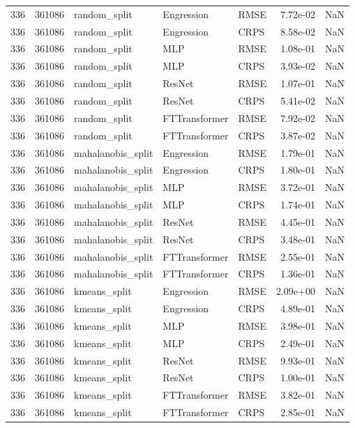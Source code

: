 \begin{tabular}{rrlllrr}
336 & 361086 & random\_split & Engression & RMSE & 7.72e-02 & NaN \\
336 & 361086 & random\_split & Engression & CRPS & 8.58e-02 & NaN \\
336 & 361086 & random\_split & MLP & RMSE & 1.08e-01 & NaN \\
336 & 361086 & random\_split & MLP & CRPS & 3.93e-02 & NaN \\
336 & 361086 & random\_split & ResNet & RMSE & 1.07e-01 & NaN \\
336 & 361086 & random\_split & ResNet & CRPS & 5.41e-02 & NaN \\
336 & 361086 & random\_split & FTTransformer & RMSE & 7.92e-02 & NaN \\
336 & 361086 & random\_split & FTTransformer & CRPS & 3.87e-02 & NaN \\
336 & 361086 & mahalanobis\_split & Engression & RMSE & 1.79e-01 & NaN \\
336 & 361086 & mahalanobis\_split & Engression & CRPS & 1.80e-01 & NaN \\
336 & 361086 & mahalanobis\_split & MLP & RMSE & 3.72e-01 & NaN \\
336 & 361086 & mahalanobis\_split & MLP & CRPS & 1.74e-01 & NaN \\
336 & 361086 & mahalanobis\_split & ResNet & RMSE & 4.45e-01 & NaN \\
336 & 361086 & mahalanobis\_split & ResNet & CRPS & 3.48e-01 & NaN \\
336 & 361086 & mahalanobis\_split & FTTransformer & RMSE & 2.55e-01 & NaN \\
336 & 361086 & mahalanobis\_split & FTTransformer & CRPS & 1.36e-01 & NaN \\
336 & 361086 & kmeans\_split & Engression & RMSE & 2.09e+00 & NaN \\
336 & 361086 & kmeans\_split & Engression & CRPS & 4.89e-01 & NaN \\
336 & 361086 & kmeans\_split & MLP & RMSE & 3.98e-01 & NaN \\
336 & 361086 & kmeans\_split & MLP & CRPS & 2.49e-01 & NaN \\
336 & 361086 & kmeans\_split & ResNet & RMSE & 9.93e-01 & NaN \\
336 & 361086 & kmeans\_split & ResNet & CRPS & 1.00e-01 & NaN \\
336 & 361086 & kmeans\_split & FTTransformer & RMSE & 3.82e-01 & NaN \\
336 & 361086 & kmeans\_split & FTTransformer & CRPS & 2.85e-01 & NaN \\

\end{tabular}
